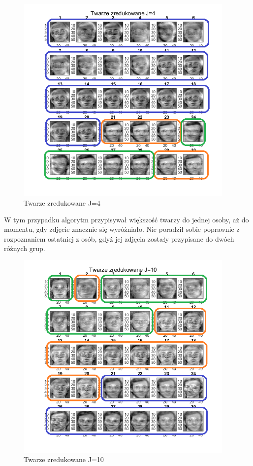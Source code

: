 \documentclass[11pt, a4paper]{article}
\newcommand{\fbi}{\leavevmode{\parindent=1em\indent}}
\begin{document}
\begin{figure}[H]
	\centering
	\includegraphics[width=0.95\textwidth]{./assets/ilustracja_zad2_redukcja_j4.png}
	\caption{Twarze zredukowane J=4}
	\label{fig:ilustracja_zad2_redukcja_j4}
\end{figure}

\fbi
W tym przypadku algorytm przypisywał większość twarzy do jednej osoby, aż do momentu, gdy zdjęcie znacznie się wyróżniało. Nie poradził sobie poprawnie z rozpoznaniem ostatniej z osób, gdyż jej zdjęcia zostały przypisane do dwóch różnych grup.


\begin{figure}[H]
	\centering
	\includegraphics[width=0.95\textwidth]{./assets/ilustracja_zad2_redukcja_j10.png}
	\caption{Twarze zredukowane J=10}
	\label{fig:ilustracja_zad2_redukcja_j10}
\end{figure}
\end{document}
